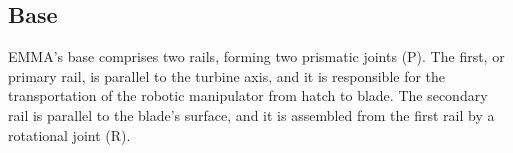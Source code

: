 % 


 

\subsection{Base}

EMMA's base comprises two rails, forming two prismatic joints (P). The
first, or primary rail, is parallel to the turbine axis, and it is responsible
for the transportation of the robotic manipulator from hatch to blade. The
secondary rail is parallel to the blade's surface, and it is assembled from the
first rail by a rotational joint (R).

